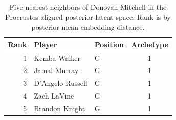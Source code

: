 \begin{table}[htbp]
  \centering\small
  \begin{tabular}{rllc}
    \toprule
    Rank & Player & Position & Archetype \\
    \midrule
    1 & Kemba Walker & G & 1 \\
    2 & Jamal Murray & G & 1 \\
    3 & D'Angelo Russell & G & 1 \\
    4 & Zach LaVine & G & 1 \\
    5 & Brandon Knight & G & 1 \\
    \bottomrule
  \end{tabular}
  \caption{Five nearest neighbors of Donovan Mitchell in the Procrustes-aligned posterior latent space. Rank is by posterior mean embedding distance.}
  \label{tab:Donovan_Mitchell_neighbors}
\end{table}

